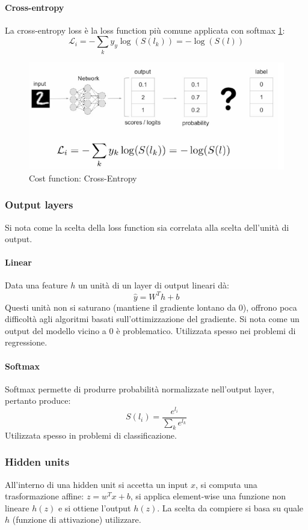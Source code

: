 \paragraph{Cross-entropy}
La cross-entropy loss \`e la loss function pi\`u comune applicata con softmax \ref{fig:chapter11-06}:
$$\mathcal{L}_i = -\sum\limits_ky_y\log(S(l_k)) = -\log(S(l))$$

\begin{figure}
	\centering
	\includegraphics[width=0.6\linewidth]{imgs/chapter11/img6}
	\caption{Cost function: Cross-Entropy}
	\label{fig:chapter11-06}
\end{figure}

		\subsubsection{Output layers}
		Si nota come la scelta della loss function sia correlata alla scelta dell'unit\`a di output.

		\paragraph{Linear}
		Data una feature $h$ un unit\`a di un layer di output lineari d\`a:
		$$\hat{y} = W^Th+b$$
		Questi unit\`a non si saturano (mantiene il gradiente lontano da $0$), offrono poca difficolt\`a agli algoritmi basati sull'ottimizzazione del gradiente.
		Si nota come un output del modello vicino a $0$ \`e problematico.
		Utilizzata spesso nei problemi di regressione.
		
		\paragraph{Softmax}
		Softmax permette di produrre probabilit\`a normalizzate nell'output layer, pertanto produce:
		$$S(l_i) = \frac{e^{l_i}}{\sum\limits_ke^{l_k}}$$
		Utilizzata spesso in problemi di classificazione.
		\subsubsection{Hidden units}
		All'interno di una hidden unit si accetta un input $x$, si computa una trasformazione affine: $z = w^Tx+b$, si applica element-wise una funzione non lineare $h(z)$ e si ottiene l'output $h(z)$.
		La scelta da compiere si basa su quale $h$ (funzione di attivazione) utilizzare.

